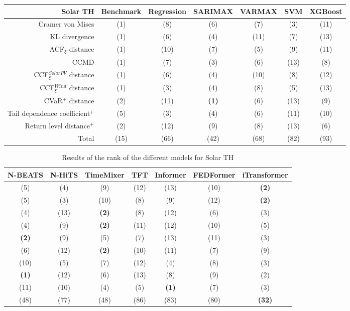 \newpage
\begin{table}[ht]
    \footnotesize
    \begin{tabular}[l]{r|c|ccc|cc|}
        \toprule
        \textbf{Solar TH} &Benchmark&Regression&SARIMAX&VARMAX&SVM&XGBoost \\
        \midrule            
        Cramer von Mises&(1)&(8)&(6)&(7)&(3)&(11) \\
        KL divergence&(1)&(6)&(4)&(11)&(7)&(13) \\
        ACF$_\xi$ distance&(1)&(10)&(7)&(5)&(9)&(11) \\
        \midrule
        CCMD&(1)&(7)&(3)&(6)&(13)&(8) \\
        CCF$_\xi^{Solar PV}$ distance&(1)&(6)&(4)&(10)&(8)&(12) \\
        CCF$_\xi^{Wind}$ distance&(1)&(3)&(4)&(8)&(5)&(13) \\
        \midrule
        CVaR$^+$ distance&(2)&(11)&\textbf{(1)}&(6)&(13)&(9) \\
        Tail dependence coefficient$^+$&(5)&(3)&(4)&(6)&(11)&(10) \\
        Return level distance$^+$&(2)&(12)&(9)&(8)&(13)&(6) \\
        \bottomrule
        Total&(15)&(66)&(42)&(68)&(82)&(93) \\
        \bottomrule
    \end{tabular}
\end{table}
\begin{table}[ht]
    \footnotesize
    \begin{flushright}
    \begin{tabular}[r]{|ccc|cccc}
        \toprule
        N-BEATS&N-HiTS&TimeMixer&TFT&Informer&FEDFormer&iTransformer \\
        \midrule            
        (5)&(4)&(9)&(12)&(13)&(10)&\textbf{(2)} \\
        (5)&(3)&(10)&(8)&(9)&(12)&\textbf{(2)} \\
        (4)&(13)&\textbf{(2)}&(8)&(12)&(6)&(3) \\
        \midrule
        (4)&(9)&\textbf{(2)}&(11)&(12)&(10)&(5) \\
        \textbf{(2)}&(9)&(5)&(7)&(13)&(11)&(3) \\
        (6)&(12)&\textbf{(2)}&(10)&(11)&(7)&(9) \\
        \midrule
        (10)&(5)&(7)&(12)&(4)&(8)&(3) \\
        \textbf{(1)}&(12)&(6)&(13)&(8)&(9)&(2) \\
        (11)&(10)&(4)&(5)&\textbf{(1)}&(7)&(3) \\
        \bottomrule
        (48)&(77)&(48)&(86)&(83)&(80)&\textbf{(32)} \\
        \bottomrule
    \end{tabular}
    \end{flushright}
    \caption{Results of the rank of the different models for Solar TH\label{long}}
    \label{table:results-rank-solar-pv}
\end{table}

